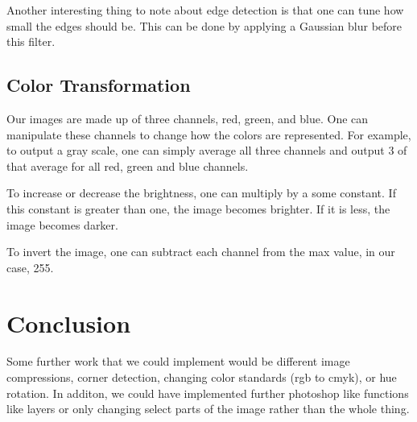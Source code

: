 \documentclass[11pt]{article}
\begin{document}
Another interesting thing to note about edge detection is that one can tune how small the edges should be. This can be done by applying a Gaussian blur before this filter.

\subsection{Color Transformation}
Our images are made up of three channels, red, green, and blue. One can manipulate these channels to change how the colors are represented. For example, to output a gray scale, one can simply average all three channels and output 3 of that average for all red, green and blue channels.

To increase or decrease the brightness, one can multiply by a some constant. If this constant is greater than one, the image becomes brighter. If it is less, the image becomes darker. 

To invert the image, one can subtract each channel from the max value, in our case, 255.





\section{Conclusion}
Some further work that we could implement would be different image compressions, corner detection, changing color standards (rgb to cmyk), or hue rotation. In additon, we could have implemented further photoshop like
functions like layers or only changing select parts of the image rather than the whole thing.
\end{document}

